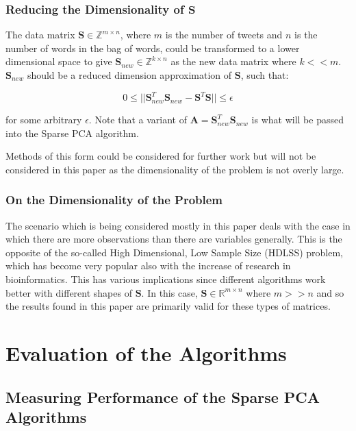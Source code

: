 \documentclass[11pt,a4paper]{article}
\newcommand{\inreal}{\in \mathbb{R}}
\newcommand{\smat}{\mathbf{S}}
\begin{document}
\subsubsection{Reducing the Dimensionality of $\mathbf{S}$}
The data matrix $\mathbf{S} \in \mathbb{Z}^{m \times n}$, where $m$ is the number of tweets and $n$ is the number of words in the bag of words, could be transformed to a lower dimensional space to give $\mathbf{S}_{new} \in \mathbb{Z}^{k \times n}$ as the new data matrix where $k << m$. $\mathbf{S}_{new}$ should be a reduced dimension approximation of  $\mathbf{S}$, such that:


\begin{equation*}
0 \le ||\mathbf{S}_{new}^T\mathbf{S}_{new} - \mathbf{S}^T\mathbf{S}|| \le \epsilon 
\end{equation*}

for some arbitrary $\epsilon$. Note that a variant of $\mathbf{A} = \mathbf{S}_{new}^T\mathbf{S}_{new}$ is what will be passed into the Sparse PCA algorithm. 

Methods of this form could be considered for further work but will not be considered in this paper as the dimensionality of the problem is not overly large.

\subsubsection{On the Dimensionality of the Problem}
The scenario which is being considered mostly in this paper deals with the case in which there are more observations than there are variables generally. This is the opposite of the so-called High Dimensional, Low Sample Size (HDLSS) problem, which has become very popular also with the increase of research in bioinformatics. This has various implications since different algorithms work better with different shapes of $\smat$. In this case, $\smat \inreal^{m\times n}$ where $m >> n$ and so the results found in this paper are primarily valid for these types of matrices. 


\clearpage

\section{Evaluation of the Algorithms}
\subsection{Measuring Performance of the Sparse PCA Algorithms}
\end{document}

